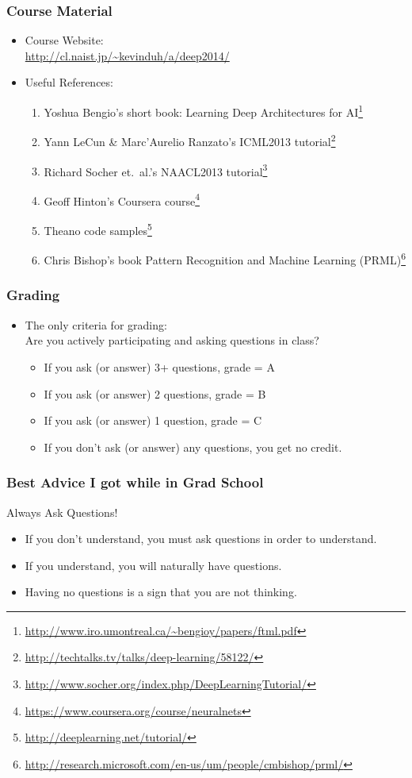 \documentclass{beamer}
\newcommand{\bi}{\begin{itemize}}
\newcommand{\ei}{\end{itemize}}
\newcommand{\be}{\begin{enumerate}}
\newcommand{\ee}{\end{enumerate}}
\begin{document}
\begin{frame}
\frametitle{Course Material}
\bi
\item Course Website:\\ \url{http://cl.naist.jp/~kevinduh/a/deep2014/}
\vspace{0.5cm}
\item Useful References:
	\be
	\item Yoshua Bengio's \cite{bengio09book} short book: Learning Deep Architectures for AI\footnote{\url{http://www.iro.umontreal.ca/~bengioy/papers/ftml.pdf}}
	\item Yann LeCun \& Marc'Aurelio Ranzato's ICML2013 tutorial\footnote{\url{http://techtalks.tv/talks/deep-learning/58122/}}
	\item Richard Socher et.~al.'s NAACL2013 tutorial\footnote{\url{http://www.socher.org/index.php/DeepLearningTutorial/}}
	\item Geoff Hinton's Coursera course\footnote{\url{https://www.coursera.org/course/neuralnets}}
	\item Theano code samples\footnote{\url{http://deeplearning.net/tutorial/}}
	\item Chris Bishop's book Pattern Recognition and Machine Learning (PRML)\footnote{\url{http://research.microsoft.com/en-us/um/people/cmbishop/prml/}}
	\ee
\ei
\end{frame}

\begin{frame}
\frametitle{Grading}
\bi
\item The only criteria for grading:\\ Are you actively participating and asking questions in class?
	\bi
	\item If you ask (or answer) 3+ questions, grade = A
	\item If you ask (or answer) 2 questions, grade = B
	\item If you ask (or answer) 1 question, grade = C 
	\item If you don't ask (or answer) any questions, you get no credit.
	\ei
\ei
\end{frame}


\begin{frame}
\frametitle{Best Advice I got while in Grad School}
Always Ask Questions!
\bi
\pause
\item If you don't understand, you must ask questions in order to understand.
\pause
\item If you understand, you will naturally have questions. 
\pause
\item Having no questions is a sign that you are not thinking.
\ei
\end{frame}
\end{document}
